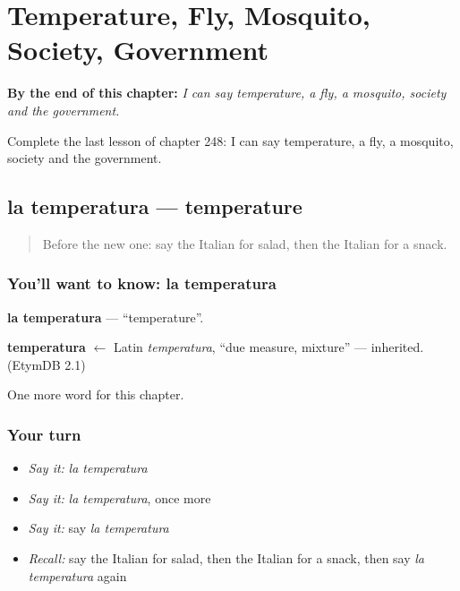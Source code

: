 
\chapter{Temperature, Fly, Mosquito, Society, Government}
\label{ch:it-temperature-fly-mosquito-society-government}

\begin{chapteropening}
\textbf{By the end of this chapter:} \emph{I can say temperature, a fly, a mosquito, society and the government.}

Complete the last lesson of chapter 248: I can say temperature, a fly, a mosquito, society and the government.
\end{chapteropening}

\section[la temperatura]{la temperatura — temperature}

\label{lesson:IT-C248-temperatura}



\begin{quote}
Before the new one: say the Italian for salad, then the Italian for a snack.
\end{quote}

\subsection*{You'll want to know: la temperatura}
\textbf{la temperatura} — \textquotedblleft{}temperature\textquotedblright{}.

\begin{cousinweb}
\textbf{temperatura} $\leftarrow$ Latin \emph{temperatura}, \textquotedblleft{}due measure, mixture\textquotedblright{} — inherited. (EtymDB 2.1)
\end{cousinweb}

\begin{grammarlens}[title={What you've built}]
One more word for this chapter.
\end{grammarlens}

\subsection*{Your turn}
\begin{itemize}
\raggedright
  \item \emph{Say it:} \emph{la temperatura}
  \item \emph{Say it:} \emph{la temperatura}, once more
  \item \emph{Say it:} say \emph{la temperatura}
  \item \emph{Recall:} say the Italian for salad, then the Italian for a snack, then say \emph{la temperatura} again
\end{itemize}

